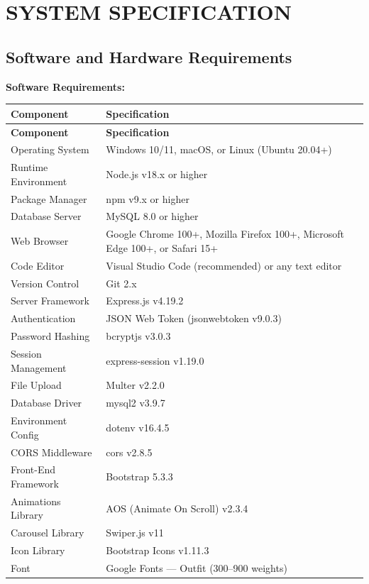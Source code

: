 \chapter{SYSTEM SPECIFICATION}

\section{Software and Hardware Requirements}

\textbf{Software Requirements:}

\begin{longtable}{|p{4cm}|p{9cm}|}
\hline
\textbf{Component} & \textbf{Specification} \\
\hline
\endfirsthead
\hline
\textbf{Component} & \textbf{Specification} \\
\hline
\endhead
Operating System & Windows 10/11, macOS, or Linux (Ubuntu 20.04+) \\
\hline
Runtime Environment & Node.js v18.x or higher \\
\hline
Package Manager & npm v9.x or higher \\
\hline
Database Server & MySQL 8.0 or higher \\
\hline
Web Browser & Google Chrome 100+, Mozilla Firefox 100+, Microsoft Edge 100+, or Safari 15+ \\
\hline
Code Editor & Visual Studio Code (recommended) or any text editor \\
\hline
Version Control & Git 2.x \\
\hline
Server Framework & Express.js v4.19.2 \\
\hline
Authentication & JSON Web Token (jsonwebtoken v9.0.3) \\
\hline
Password Hashing & bcryptjs v3.0.3 \\
\hline
Session Management & express-session v1.19.0 \\
\hline
File Upload & Multer v2.2.0 \\
\hline
Database Driver & mysql2 v3.9.7 \\
\hline
Environment Config & dotenv v16.4.5 \\
\hline
CORS Middleware & cors v2.8.5 \\
\hline
Front-End Framework & Bootstrap 5.3.3 \\
\hline
Animations Library & AOS (Animate On Scroll) v2.3.4 \\
\hline
Carousel Library & Swiper.js v11 \\
\hline
Icon Library & Bootstrap Icons v1.11.3 \\
\hline
Font & Google Fonts --- Outfit (300--900 weights) \\
\hline
\end{longtable}

